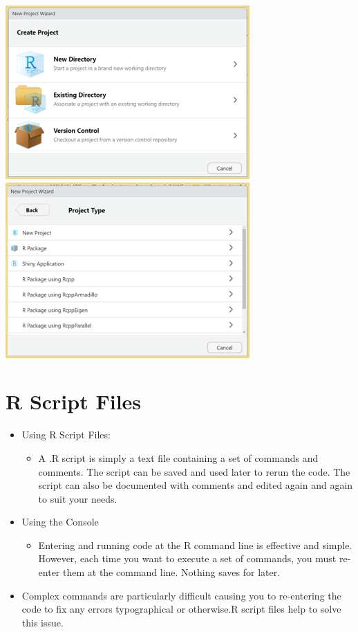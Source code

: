 \documentclass[
  letterpaper,
  DIV=11,
  numbers=noendperiod]{scrreprt}
\providecommand{\tightlist}{%
  \setlength{\itemsep}{0pt}\setlength{\parskip}{0pt}}\usepackage{longtable,booktabs,array}
\begin{document}
\includegraphics{Pictures/Ch0/CreateProject.png}
\includegraphics{Pictures/Ch0/Project.png}

\section{R Script Files}\label{r-script-files}

\begin{itemize}
\tightlist
\item
  Using R Script Files:

  \begin{itemize}
  \tightlist
  \item
    A .R script is simply a text file containing a set of commands and
    comments. The script can be saved and used later to rerun the code.
    The script can also be documented with comments and edited again and
    again to suit your needs.
  \end{itemize}
\item
  Using the Console

  \begin{itemize}
  \tightlist
  \item
    Entering and running code at the R command line is effective and
    simple. However, each time you want to execute a set of commands,
    you must re-enter them at the command line. Nothing saves for later.
  \end{itemize}
\item
  Complex commands are particularly difficult causing you to re-entering
  the code to fix any errors typographical or otherwise.R script files
  help to solve this issue.
\end{itemize}
\end{document}
